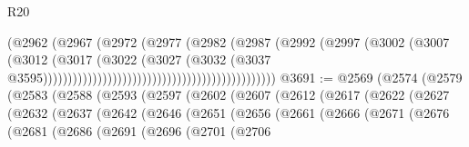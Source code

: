 \begin{lexlean}{R20}
\begin{coremodule}
                                                                  (@2962
                                                                    (@2967
                                                                      (@2972
                                                                        (@2977
                                                                          (@2982
                                                                            (@2987
                                                                              (@2992
                                                                                (@2997
                                                                                  (@3002
                                                                                    (@3007
                                                                                      (@3012
                                                                                        (@3017
                                                                                          (@3022
                                                                                            (@3027
                                                                                              (@3032
                                                                                                (@3037
                                                                                                  @3595)))))))))))))))))))))))))))))))))))))))))))))))
@3691 := @2569
    (@2574
      (@2579
        (@2583
          (@2588
            (@2593
              (@2597
                (@2602
                  (@2607
                    (@2612
                      (@2617
                        (@2622
                          (@2627
                            (@2632
                              (@2637
                                (@2642
                                  (@2646
                                    (@2651
                                      (@2656
                                        (@2661
                                          (@2666
                                            (@2671
                                              (@2676
                                                (@2681
                                                  (@2686
                                                    (@2691
                                                      (@2696
                                                        (@2701
                                                          (@2706

\end{coremodule}
\end{lexlean}
